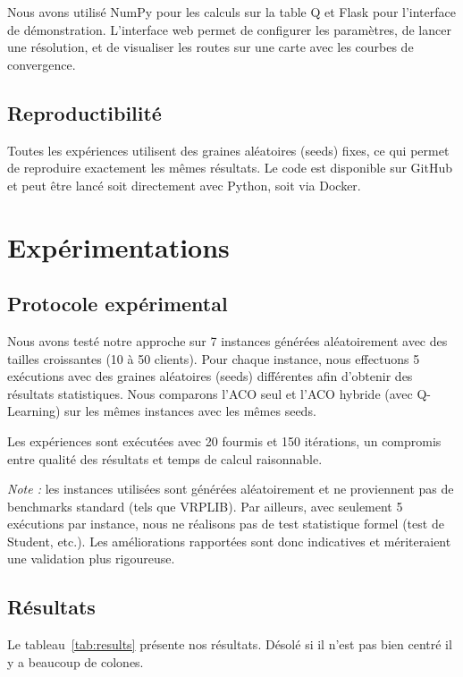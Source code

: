 \documentclass[12pt, a4paper]{article}
\begin{document}
Nous avons utilisé NumPy pour les calculs sur la table Q et Flask pour l'interface de démonstration. L'interface web permet de configurer les paramètres, de lancer une résolution, et de visualiser les routes sur une carte avec les courbes de convergence.

\subsection{Reproductibilité}

Toutes les expériences utilisent des graines aléatoires (seeds) fixes, ce qui permet de reproduire exactement les mêmes résultats. Le code est disponible sur GitHub et peut être lancé soit directement avec Python, soit via Docker.

\section{Expérimentations}

\subsection{Protocole expérimental}

Nous avons testé notre approche sur 7 instances générées aléatoirement avec des tailles croissantes (10 à 50 clients). Pour chaque instance, nous effectuons 5 exécutions avec des graines aléatoires (seeds) différentes afin d'obtenir des résultats statistiques. Nous comparons l'ACO seul et l'ACO hybride (avec Q-Learning) sur les mêmes instances avec les mêmes seeds.

Les expériences sont exécutées avec 20 fourmis et 150 itérations, un compromis entre qualité des résultats et temps de calcul raisonnable.

\textit{Note :} les instances utilisées sont générées aléatoirement et ne proviennent pas de benchmarks standard (tels que VRPLIB). Par ailleurs, avec seulement 5 exécutions par instance, nous ne réalisons pas de test statistique formel (test de Student, etc.). Les améliorations rapportées sont donc indicatives et mériteraient une validation plus rigoureuse.

\subsection{Résultats}

Le tableau~\ref{tab:results} présente nos résultats. Désolé si il n'est pas bien centré il y a beaucoup de colones.
\end{document}
